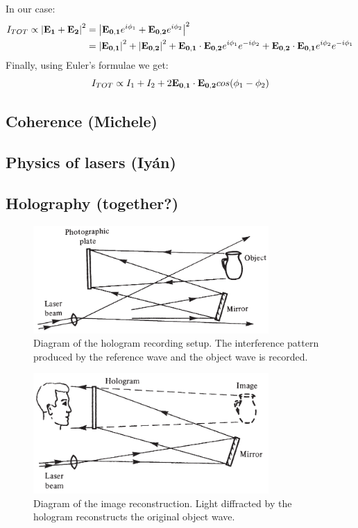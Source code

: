 \documentclass[11pt,a4paper]{article}
\begin{document}
In our case:
\begin{align*}
I_{TOT}\propto \abs{\vb{E_1}+\vb{E_2}}^2 &=\abs{\vb{E_{0,1}}e^{i\phi_1}+\vb{E_{0,2}}e^{i\phi_2}}^2\\
&=\abs{\vb{E_{0,1}}}^2+\abs{\vb{E_{0,2}}}^2+\vb{E_{0,1}}\cdot \vb{E_{0,2}}e^{i\phi_1}e^{-i\phi_2}+\vb{E_{0,2}}\cdot \vb{E_{0,1}}e^{i\phi_2}e^{-i\phi_1}
\end{align*}
Finally, using Euler's formulae we get:
\begin{equation}
I_{TOT}\propto I_1+I_2+2\vb{E_{0,1}}\cdot \vb{E_{0,2}}cos(\phi_1-\phi_2)
\end{equation}

\subsection{Coherence (Michele)}

\subsection{Physics of lasers (Iyán)}

\subsection{Holography (together?)}

\begin{figure}[ht]
\centering
\includegraphics[width=0.8\textwidth]{Hologram_recording}
\caption{Diagram of the hologram recording setup. The interference pattern produced by the reference wave and the object wave is recorded.\cite{hariharan_2002}}
\label{fig:hologram_recording}
\end{figure}

\begin{figure}[ht]
\centering
\includegraphics[width=0.8\textwidth]{Hologram_image_reconstruction}
\caption{Diagram of the image reconstruction. Light diffracted by the hologram reconstructs the original object wave.\cite{hariharan_2002}}
\label{fig:hologram_reconstruction}
\end{figure}
\end{document}
